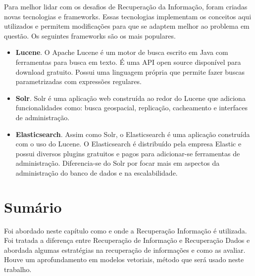 Para melhor lidar com os desafios de Recuperação da Informação, foram criadas novas tecnologias e frameworks. Essas tecnologias implementam os conceitos aqui utilizados e permitem modificações para que se adaptem melhor ao problema em questão. Os seguintes frameworks são os mais populares.

\begin{itemize}
    \item \textbf{Lucene}. O Apache Lucene é um motor de busca escrito em Java com ferramentas para busca em texto. É uma API open source disponível para download gratuito. Possui uma linguagem própria que permite fazer buscas parametrizadas com expressões regulares. 
    \item \textbf{Solr}. Solr é uma aplicação web construída ao redor do Lucene que adiciona funcionalidades como: busca geospacial, replicação, cacheamento e interfaces de administração.
    \item \textbf{Elasticsearch}. Assim como Solr, o Elasticsearch é uma aplicação construída com o uso do Lucene. O Elasticsearch é distribuído pela empresa Elastic e possui diversos plugins gratuitos e pagos para adicionar-se ferramentas de administração. Diferencia-se do Solr por focar mais em aspectos da administração do banco de dados e na escalabilidade.
\end{itemize}

\section{Sumário}

Foi abordado neste capítulo como e onde a Recuperação Informação é utilizada. Foi tratada a diferença entre Recuperação de Informação e Recuperação Dados e abordada algumas estratégias na recuperação de informações e como as avaliar. Houve um aprofundamento em modelos vetoriais, método que será usado neste trabalho.